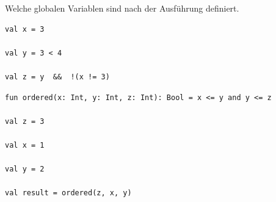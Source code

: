 \documentclass[DIV = 11]{scrartcl}
\begin{document}
\begin{aufgabe}
Welche globalen Variablen sind nach der Ausführung definiert.
\begin{teilaufgaben}
\teilaufgabe \begin{verbatim}
val x = 3

val y = 3 < 4

val z = y  &&  !(x != 3)
\end{verbatim}

\teilaufgabe \begin{verbatim}
fun ordered(x: Int, y: Int, z: Int): Bool = x <= y and y <= z 

val z = 3

val x = 1

val y = 2

val result = ordered(z, x, y)
\end{verbatim}


\end{teilaufgaben}


\end{aufgabe}
\end{document}
